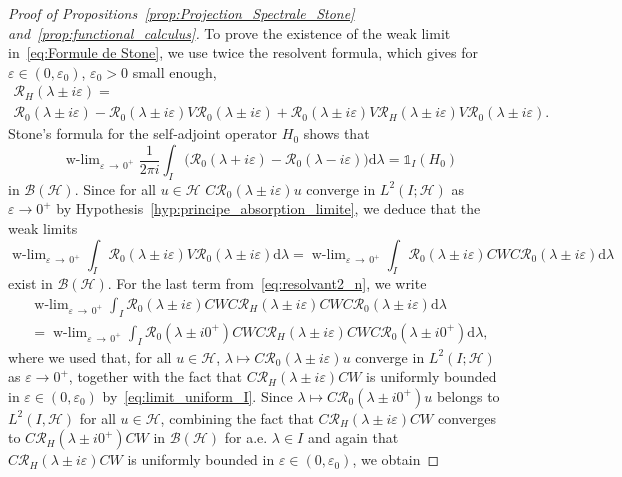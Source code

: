 \documentclass[AHL,Unicode,longabstracts,published]{cedram}
\newcommand{\Hi}{\mathcal{H}}
\newcommand{\rmd}{\mathrm{d}}
\newcommand{\Res}{\mathcal{R}}
\newcommand{\clB}{\mathcal{B}}
\DeclareMathOperator{\wlim}{w-lim}
\newcommand{\Hi}{\mathcal{H}}
\begin{document}
\begin{proof}[Proof of Propositions~\ref{prop:Projection_Spectrale_Stone} and~\ref{prop:functional_calculus}]
To prove the existence of the weak limit in~\eqref{eq:Formule de Stone}, we use twice the resolvent formula, which gives for $\varepsilon\in(0,\varepsilon_0)$, $\varepsilon_0>0$ small enough,
\begin{multline}\label{eq:resolvant2_n}
\Res_H(\lambda\pm i\varepsilon) =\\
\Res_0(\lambda\pm i\varepsilon)-\Res_0(\lambda\pm i\varepsilon)V\Res_0(\lambda\pm i\varepsilon)+\Res_0(\lambda\pm i\varepsilon)V\Res_H(\lambda\pm i\varepsilon)V\Res_0(\lambda\pm i\varepsilon)
.
\end{multline}
Stone's formula for the self-adjoint operator $H_0$ shows that
\begin{equation}\label{eq:Formule de Stone_for_H_0}
\wlim_{\varepsilon\,\rightarrow\,0^+}\frac{1}{2\pi i}\int_I\big(\Res_{0}(\lambda+i\varepsilon)-\Res_{0}(\lambda-i\varepsilon)\big)\rmd \lambda = \mathds{1}_{I}(H_0)
\end{equation}
in $\clB(\Hi)$. Since for all $u\in\mathcal{H}$ $C\Res_0(\lambda\pm i\varepsilon)u$ converge in $L^2(I;\Hi)$ as $\varepsilon\rightarrow 0^+$ by Hypothesis~\ref{hyp:principe_absorption_limite}, we deduce that the weak limits
\begin{equation}\label{eq:f1}
\wlim_{\varepsilon\,\rightarrow\,0^+}\int_I \Res_{0}(\lambda\pm i\varepsilon)V\Res_{0}(\lambda\pm i\varepsilon) \rmd \lambda = \wlim_{\varepsilon\,\rightarrow\,0^+}\int_I \Res_{0}(\lambda\pm i\varepsilon)CWC\Res_{0}(\lambda\pm i\varepsilon) \rmd \lambda
\end{equation}
exist in $\clB(\Hi)$. For the last term from~\eqref{eq:resolvant2_n}, we write
\begin{multline}\label{eq:f2}
\wlim_{\varepsilon\,\rightarrow\,0^+}\int_I \Res_0(\lambda\pm i\varepsilon)CWC\Res_H(\lambda\pm i\varepsilon)CWC\Res_0(\lambda\pm i\varepsilon) \rmd \lambda\\
= \wlim_{\varepsilon\,\rightarrow\,0^+}\int_I \Res_0(\lambda\pm i0^+)CWC\Res_H(\lambda\pm i\varepsilon)CWC\Res_0(\lambda\pm i0^+) \rmd \lambda, 
\end{multline}
where we used that, for all $u\in\Hi$, $\lambda\mapsto C\Res_0(\lambda\pm i\varepsilon)u$ converge in $L^2(I;\Hi)$ as $\varepsilon\rightarrow 0^+$, together with the fact that $C\Res_H(\lambda\pm i\varepsilon)CW$ is uniformly bounded in $\varepsilon\in(0,\varepsilon_0)$ by~\eqref{eq:limit_uniform_I}. Since $\lambda\mapsto C\Res_0(\lambda\pm i0^+)u$ belongs to $L^2(I,\Hi)$ for all $u\in \Hi$, combining the fact that $C\Res_H(\lambda\pm i\varepsilon)CW$ converges to $C\Res_H(\lambda\pm i0^+)CW$ in $\clB(\Hi)$ for a.e. $\lambda\in I$ and again that $C\Res_H(\lambda\pm i\varepsilon)CW$ is uniformly bounded in $\varepsilon\in(0,\varepsilon_0)$, we obtain

\end{proof}
\end{document}
